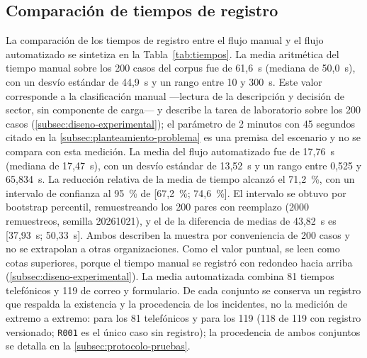 \subsection{Comparación de tiempos de registro}\label{subsec:comparacion-tiempos}

La comparación de los tiempos de registro entre el flujo manual y el flujo automatizado se sintetiza en la Tabla~\ref{tab:tiempos}. La media aritmética del tiempo manual sobre los 200 casos del corpus fue de 61,6~s (mediana de 50,0~s), con un desvío estándar de 44,9~s y un rango entre 10 y 300~s. Este valor corresponde a la clasificación manual ---lectura de la descripción y decisión de sector, sin componente de carga--- y describe la tarea de laboratorio sobre los 200 casos (\autoref{subsec:diseno-experimental}); el parámetro de 2 minutos con 45 segundos citado en la \autoref{subsec:planteamiento-problema} es una premisa del escenario y no se compara con esta medición. La media del flujo automatizado fue de 17,76~s (mediana de 17,47~s), con un desvío estándar de 13,52~s y un rango entre 0,525 y 65,834~s. La reducción relativa de la media de tiempo alcanzó el 71,2~\%, con un intervalo de confianza al 95~\% de [67,2~\%; 74,6~\%]. El intervalo se obtuvo por bootstrap percentil, remuestreando los 200 pares con reemplazo (2000 remuestreos, semilla 20261021), y el de la diferencia de medias de 43,82~s es [37,93~s; 50,33~s]. Ambos describen la muestra por conveniencia de 200 casos y no se extrapolan a otras organizaciones. Como el valor puntual, se leen como cotas superiores, porque el tiempo manual se registró con redondeo hacia arriba (\autoref{subsec:diseno-experimental}). La media automatizada combina 81 tiempos telefónicos y 119 de correo y formulario. De cada conjunto se conserva un registro que respalda la existencia y la procedencia de los incidentes, no la medición de extremo a extremo:  para los 81 telefónicos y  para los 119 (118 de 119 con registro versionado; \texttt{R001} es el único caso sin registro); la procedencia de ambos conjuntos se detalla en la \autoref{subsec:protocolo-pruebas}.

